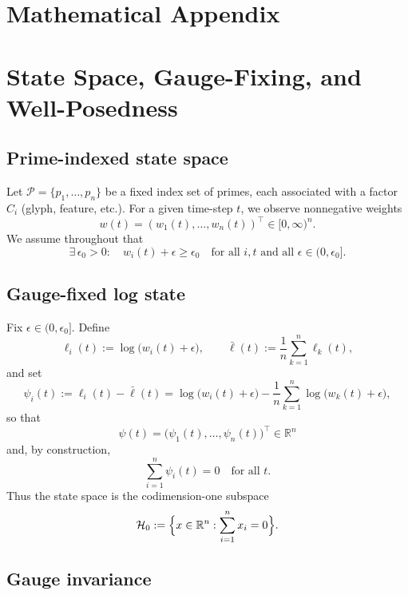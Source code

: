 \documentclass[11pt]{article}
\begin{document}
\appendix
\section*{Mathematical Appendix}

\setcounter{section}{0}
\renewcommand{\thesection}{A.\arabic{section}}

\section{State Space, Gauge-Fixing, and Well-Posedness}

\subsection{Prime-indexed state space}

Let \(\mathcal{P} = \{p_1,\dots,p_n\}\) be a fixed index set of primes, each associated with a factor \(C_i\) (glyph, feature, etc.). For a given time-step \(t\), we observe nonnegative weights
\[
w(t) = (w_1(t),\dots,w_n(t))^\top \in [0,\infty)^n.
\]
We assume throughout that
\begin{equation}
\exists\,\epsilon_0>0:\quad w_i(t)+\epsilon \ge \epsilon_0\quad
\text{for all } i,t\text{ and all } \epsilon\in(0,\epsilon_0].
\label{eq:epsilon-lower-bound}
\end{equation}

\subsection{Gauge-fixed log state}

Fix \(\epsilon\in(0,\epsilon_0]\). Define
\[
\ell_i(t) := \log\bigl(w_i(t)+\epsilon\bigr),\qquad
\bar{\ell}(t) := \frac{1}{n}\sum_{k=1}^n \ell_k(t),
\]
and set
\begin{equation}
\psi_i(t)
  := \ell_i(t) - \bar{\ell}(t)
  = \log\bigl(w_i(t)+\epsilon\bigr)
    - \frac{1}{n}\sum_{k=1}^n \log\bigl(w_k(t)+\epsilon\bigr),
\label{eq:psi-def}
\end{equation}
so that
\[
\psi(t) = \bigl(\psi_1(t),\dots,\psi_n(t)\bigr)^\top \in \mathbb{R}^n
\]
and, by construction,
\begin{equation}
\sum_{i=1}^n \psi_i(t) = 0
\quad\text{for all } t.
\label{eq:psi-zero-mean}
\end{equation}
Thus the state space is the codimension-one subspace
\[
\mathcal{H}_0 := \Bigl\{ x\in\mathbb{R}^n : \sum_{i=1}^n x_i = 0 \Bigr\}.
\]

\subsection{Gauge invariance}
\end{document}

